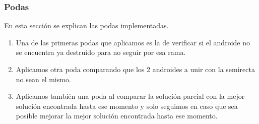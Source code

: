 
\subsubsection{Podas}
En esta sección se explican las podas implementadas.

\begin{enumerate}
\item Una de las primeras podas que aplicamos es la de verificar si el androide no se encuentra ya destruido para no seguir por esa rama.
\item Aplicamos otra poda comparando que los 2 androides a unir con la semirecta no sean el mismo.
\item Aplicamos también una poda al comparar la solución parcial con la mejor solución encontrada hasta ese momento y solo seguimos en caso que sea posible mejorar la mejor solución encontrada hasta ese momento.
\end{enumerate}

